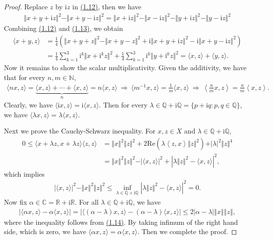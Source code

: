 \documentclass{article}
\renewcommand{\Re}{\mathrm{Re}}
\renewcommand{\i}{\mathrm{i}}
\begin{document}
\begin{proof}
Replace $z$ by $\i z$ in \hyperref[eq:1.12]{(1.12)}, then we have
\begin{align*}
	\Vert x+y+\i z\Vert^2 - \Vert x+y-\i z\Vert^2 = \Vert x+\i z\Vert^2 - \Vert x-\i z\Vert^2 - \Vert y + \i z\Vert^2 - \Vert y-\i z\Vert^2 \tag{1.13}\label{eq:1.13}
\end{align*}
Combining \hyperref[eq:1.12]{(1.12)} and \hyperref[eq:1.13]{(1.13)}, we obtain
\begin{align*}
	\langle x + y, z\rangle &= \frac{1}{4}\left(\Vert x+y+z\Vert^2  -\Vert x+y-z\Vert^2 +\i\Vert x+y+\i z\Vert^2 - \i\Vert x+y-\i z\Vert^2 \right)\\
	&= \frac{1}{4}\sum_{k=1}^3 \i^k\Vert x+\i^k z\Vert^2 + \frac{1}{4}\sum_{k=1}^3 \i^k\Vert y+\i^k z\Vert^2 = \langle x,z\rangle + \langle y,z\rangle.
\end{align*}
Now it remains to show the scalar multiplicativity. Given the additivity, we have that for every $n,m\in\mathbb{N}$,
\begin{align*}
	\langle nx, z\rangle = \underbrace{\langle x,z\rangle + \cdots + \langle x,z\rangle}_{n} = n\langle x,z\rangle\ \Rightarrow\ \langle m^{-1} x,z\rangle = \frac{1}{m}\langle x,z\rangle\ \Rightarrow\  \left\langle\frac{n}{m}x,z\right\rangle = \frac{n}{m}\left\langle x,z\right\rangle.
\end{align*}
Clearly, we have $\langle\i x,z\rangle = \i\langle x,z\rangle$. Then for every $\lambda\in\mathbb{Q}+\i\mathbb{Q}=\{p+\i q:p,q\in\mathbb{Q}\}$, we have $\langle\lambda x,z\rangle = \lambda\langle x,z\rangle$. 
\vspace{0.12cm}

Next we prove the Cauchy-Schwarz inequality. For $x,z\in X$ and $\lambda\in\mathbb{Q}+\i\mathbb{Q}$,
\begin{align*}
	0\leq\langle x+\lambda z,x+\lambda z\rangle\langle z,z\rangle &= \Vert x\Vert^2\Vert z\Vert^2 + 2\Re\left(\lambda\left\langle z,x\right\rangle\Vert z\Vert^2\right) + \vert \lambda\vert^2\Vert z\Vert^4\\
	&= \Vert x\Vert^2\Vert z\Vert^2 - \vert\langle x,z\rangle\vert^2 + \left\vert\lambda\Vert z\Vert^2 - \langle x,z\rangle\right\vert^2,
\end{align*}
which implies
\begin{align*}
	\vert\langle x,z\rangle\vert^2 - \Vert x\Vert^2\Vert z\Vert^2\leq \inf_{\lambda\in\mathbb{Q}+\i\mathbb{Q}}\left\vert\lambda\Vert z\Vert^2 - \langle x,z\rangle\right\vert^2 = 0.\tag{1.14}\label{eq:1.14}
\end{align*}
Now fix $\alpha\in\mathbb{C}=\mathbb{R}+\i\mathbb{R}$. For all $\lambda\in\mathbb{Q}+\i\mathbb{Q}$, we have
\begin{align*}
	\vert\langle \alpha x,z\rangle - \alpha\langle x,z\rangle\vert = \vert\langle (\alpha-\lambda)x,z\rangle - (\alpha-\lambda)\langle x,z\rangle\vert\leq 2\left\vert \alpha - \lambda\right\vert\left\Vert x\right\Vert\left\Vert z\right\Vert,
\end{align*}
where the inequality follows from \hyperref[eq:1.14]{(1.14)}. By taking infimum of the right hand side, which is zero, we have $\langle \alpha x,z\rangle = \alpha\langle x,z\rangle$. Then we complete the proof.
\end{proof}
\end{document}

